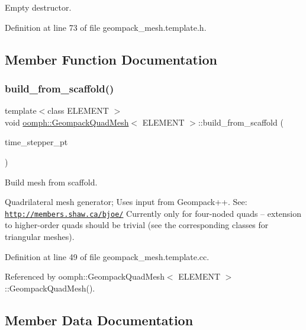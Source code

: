 Empty destructor. 



Definition at line 73 of file geompack\+\_\+mesh.\+template.\+h.



\subsection{Member Function Documentation}
\mbox{\label{classoomph_1_1GeompackQuadMesh_a714ee07999e06676f08080bac8c024db}} 
\subsubsection{\texorpdfstring{build\+\_\+from\+\_\+scaffold()}{build\_from\_scaffold()}}
{\footnotesize\ttfamily template$<$class E\+L\+E\+M\+E\+NT $>$ \\
void \hyperlink{classoomph_1_1GeompackQuadMesh}{oomph\+::\+Geompack\+Quad\+Mesh}$<$ E\+L\+E\+M\+E\+NT $>$\+::build\+\_\+from\+\_\+scaffold (\begin{DoxyParamCaption}\item[{Time\+Stepper $\ast$}]{time\+\_\+stepper\+\_\+pt }\end{DoxyParamCaption})\hspace{0.3cm}{\ttfamily [private]}}



Build mesh from scaffold. 

Quadrilateral mesh generator; Uses input from Geompack++. See\+: \href{http://members.shaw.ca/bjoe/}{\tt http\+://members.\+shaw.\+ca/bjoe/} Currently only for four-\/noded quads -- extension to higher-\/order quads should be trivial (see the corresponding classes for triangular meshes). 

Definition at line 49 of file geompack\+\_\+mesh.\+template.\+cc.



Referenced by oomph\+::\+Geompack\+Quad\+Mesh$<$ E\+L\+E\+M\+E\+N\+T $>$\+::\+Geompack\+Quad\+Mesh().



\subsection{Member Data Documentation}
\mbox{\label{classoomph_1_1GeompackQuadMesh_a0b7edabf329aed8f4fb00eddb41b3299}} 
